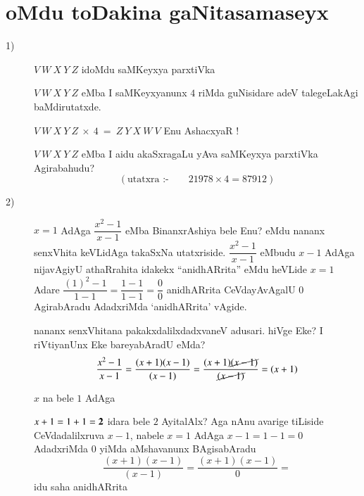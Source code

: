 \chapter{oMdu toDakina gaNitasamaseyx}

\begin{description}
\item[{\rm 1)}] $V ~W ~X ~Y ~Z$ idoMdu saMKeyxya parxtiVka

  $V ~W ~X ~Y ~Z$ eMba I saMKeyxyanunx $4$ riMda guNisidare adeV talegeLakAgi baMdirutatxde.

  $V ~W ~X ~Y ~Z ~ \times ~4 ~= ~Z ~Y~X~W~V$ Enu AshacxyaR !

  $V ~W ~X ~Y ~Z$ eMba I aidu akaSxragaLu yAva saMKeyxya parxtiVka Agirabahudu?
  $$
\left(\text{utatxra :-}\qquad  21978 \times 4 = 87912 \right)
  $$
  
\item[{\rm 2)}] $x=1$ AdAga $\dfrac{x^2-1}{x-1}$ eMba BinanxrAshiya bele Enu? eMdu nananx senxVhita keVLidAga takaSxNa utatxriside. $\dfrac{x^2-1}{x-1}$ eMbudu $x-1$ AdAga nijavAgiyU athaRrahita idakekx ``anidhARrita'' eMdu heVLide $x=1$ Adare $\dfrac{(1)^2 -1}{1-1} = \dfrac{1-1}{1-1} = \dfrac{0}{0}$ anidhARrita CeVdayAvAgalU $0$ AgirabAradu AdadxriMda `anidhARrita' vAgide.

  nananx senxVhitana pakakxdalilxdadxvaneV adusari. hiVge Eke? I riVtiyanUnx Eke bareyabAradU eMda?
  $$
  \frac{x^2-1}{x-1} = \frac{(x+1)(x-1)}{(x-1)} = \frac{(x+1)\cancel{(x-1)}}{\cancel{(x-1)}} = (x+1)
  $$

  $x$ na bele $1$ AdAga
  
  $x+1 =1+1 ={\bf 2}$ idara bele $2$ AyitalAlx? Aga nAnu avarige tiLiside CeVdadalilxruva $x-1$, nabele $x=1$ AdAga $x-1=1-1=0$ AdadxriMda $0$ yiMda aMshavanunx BAgisabAradu
  $$
  \dfrac{(x+1)(x-1)}{(x-1)} = \dfrac{(x+1)(x-1)}{0} =
  $$
  idu saha anidhARrita
\end{description}
